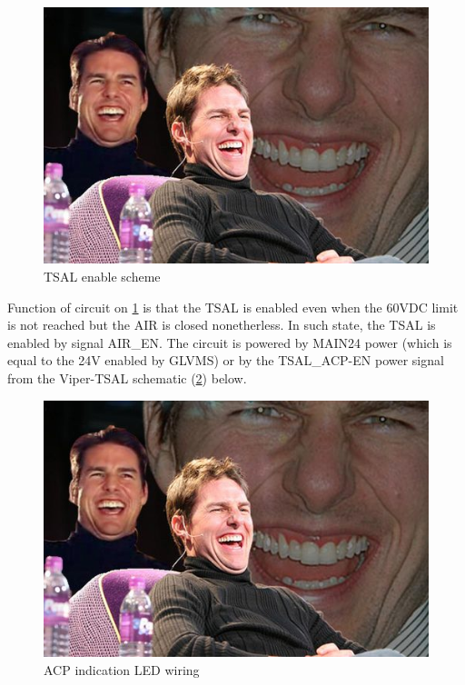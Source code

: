 \begin{figure}[H]
	\centering
	\includegraphics[width=\textwidth]{./img/tsal-wiring.jpg}
	\caption{TSAL enable scheme}
	\label{fig:TSAL-enable}
\end{figure}

Function of circuit on \ref{fig:TSAL-enable} is that the TSAL is enabled even when the 60VDC limit is not reached but the AIR is closed nonetherless. In such state, the TSAL is enabled by signal AIR\_EN. The circuit is powered by MAIN24 power (which is equal to the 24V enabled by GLVMS) or by the TSAL\_ACP-EN power signal from the Viper-TSAL schematic (\ref{fig:TSAL-ACPindicator}) below.

\begin{figure}[H]
	\centering
	\includegraphics[width=\textwidth]{./img/tsal-wiring.jpg}
	\caption{ACP indication LED wiring}
	\label{fig:TSAL-ACPindicator}
\end{figure}

